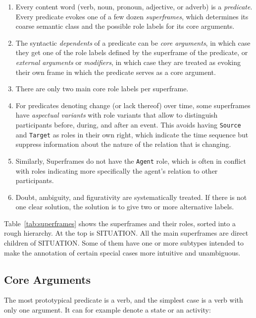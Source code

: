 \documentclass[a4paper]{article}
\newcommand{\fr}[1]{\textsf{#1}}
\begin{document}
\begin{enumerate}
    \item Every content word (verb, noun, pronoun, adjective, or adverb) is a
        \emph{predicate}. Every predicate evokes one of a few dozen
        \emph{superframes}, which determines its coarse semantic class and the
        possible role labels for its core arguments.
    \item The syntactic \emph{dependents} of a predicate can be
        \emph{core arguments}, in which case they get one of the role labels
        defined by the superframe of the predicate, or \emph{external
        arguments} or \emph{modifiers}, in which case they are treated as
        evoking their own frame in which the predicate serves as a core argument.
    \item There are only two main core role labels per superframe.
    \item For predicates denoting change (or lack thereof) over time,
        some superframes have \emph{aspectual variants} with role variants that
        allow to distinguish participants before, during, and after an event.
        This avoids having \texttt{Source} and \texttt{Target} as roles in
        their own right, which indicate the time sequence but suppress
        information about the nature of the relation that is changing.
    \item Similarly, Superframes do not have the \texttt{Agent} role, which is
        often in conflict with roles indicating more specifically the agent's
        relation to other participants.
    \item Doubt, ambiguity, and figurativity are systematically treated. If there
        is not one clear solution, the solution is to give two or more
        alternative labels.
\end{enumerate}

Table~\ref{tab:superframes} shows the superframes and their roles, sorted into
a rough hierarchy. At the top is \fr{SITUATION}. All the main superframes are
direct children of \fr{SITUATION}. Some of them have one or more subtypes
intended to make the annotation of certain special cases more intuitive and
unambiguous.

\newpage\subsection{Core Arguments}

The most prototypical predicate is a verb, and the simplest case is a verb with only one argument. It can for example denote a state or an activity:
\end{document}

